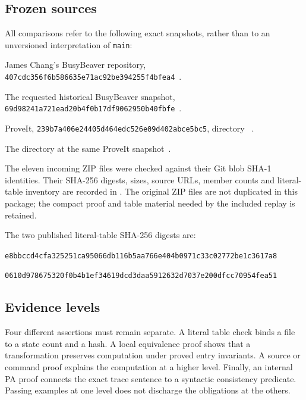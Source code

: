 \documentclass[11pt,a4paper]{article}
\newcommand{\code}[1]{\texttt{#1}}
\begin{document}
\subsection{Frozen sources}

All comparisons refer to the following exact snapshots, rather than to
an unversioned interpretation of \code{main}:
\begin{description}[style=nextline]
\item[PA196.] James Chang's BusyBeaver repository,
\nolinkurl{407cdc356f6b586635e71ac92be394255f4bfea4}~\cite{pa196}.
\item[PA209.] The requested historical BusyBeaver snapshot,
\nolinkurl{69d98241a721ead20b4f0b17df9062950b40fbfe}~\cite{pa209}.
\item[Incoming 208-state material.] ProveIt,
\nolinkurl{239b7a406e24405d464edc526e09d402abce5bc5},
directory ~\cite{incoming}.
\item[ConciseIPRA.] The directory
at the same ProveIt snapshot~\cite{ipra}.
\end{description}
The eleven incoming ZIP files were checked against their Git blob SHA-1
identities. Their SHA-256 digests, sizes, source URLs, member counts and
literal-table inventory are recorded in
.
The original ZIP files are not duplicated in this package; the compact
proof and table material needed by the included replay is retained.

The two published literal-table SHA-256 digests are:
\begin{description}[style=nextline]
\item[PA196.]
\nolinkurl{e8bbccd4cfa325251ca95066db116b5aa766e404b0971c33c02772be1c3617a8}
\item[PA209.]
\nolinkurl{0610d978675320f0b4b1ef34619dcd3daa5912632d7037e200dfcc70954fea51}
\end{description}

\subsection{Evidence levels}

Four different assertions must remain separate. A literal table check
binds a file to a state count and a hash. A local equivalence proof shows
that a transformation preserves computation under proved entry
invariants. A source or command proof explains the computation at a
higher level. Finally, an internal PA proof connects the exact trace
sentence to a syntactic consistency predicate. Passing examples at one
level does not discharge the obligations at the others.
\end{document}
